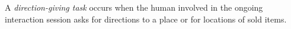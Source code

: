 \documentclass[a4paper,11pt,twoside]{StyleThese}
\begin{document}
A \textit{direction-giving task} occurs when the human involved in the ongoing interaction session asks for directions to a place or for locations of sold items. 
\end{document}
